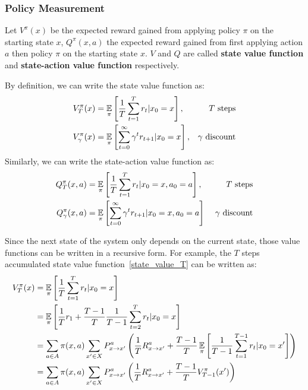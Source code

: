 \subsubsection{Policy Measurement}
Let $V^\pi(x)$ be the expected reward gained from applying policy $\pi$ on the starting state $x$, 
$Q^\pi(x, a)$ the expected reward gained from first applying action $a$ then policy $\pi$ on the starting
state $x$. $V$ and $Q$ are called \textbf{state value function} and \textbf{state-action value function}
respectively. \par
By definition, we can write the state value function as:
\begin{align}
    V^\pi_T(x) &= \operatorname*{\mathbb{E}}_\pi\left[\frac{1}{T}\sum_{t=1}^{T}r_t | x_0 = x\right], &\text{$T$ steps}
    \label{state_value_T}\\
    V^\pi_\gamma(x) &= \operatorname*{\mathbb{E}}_\pi\left[\sum_{t=0}^{\infty} \gamma^t r_{t+1} | x_0 = x\right], &\text{$\gamma$ 
    discount}\label{state_value_gamma}
\end{align}
Similarly, we can write the state-action value function as:
\begin{align}
    Q^\pi_T(x, a) &= \operatorname*{\mathbb{E}}_\pi\left[\frac{1}{T}\sum_{t=1}^T r_t | x_0 = x, a_0 = a\right], &\text{$T$ steps}
    \label{state-action_value_T}\\
    Q^\pi_\gamma(x, a) &= \operatorname*{\mathbb{E}}_\pi\left[\sum_{t=0}^\infty \gamma^t r_{t+1} | x_0 = x, a_0 = a\right] &\text{
    $\gamma$ discount}\label{state-action_value_gamma}
\end{align}
\par
Since the next state of the system only depends on the current state, those value functions can be written in
a recursive form. For example, the $T$ steps accumulated state value function~\eqref{state_value_T} can be 
written as:
\begin{align}
    V^\pi_T(x) &= \operatorname*{\mathbb{E}}_\pi \left[\frac{1}{T}\sum_{t=1}^T r_t | x_0 = x\right]\nonumber\\
               &= \operatorname*{\mathbb{E}}_\pi \left[\frac{1}{T} r_1 + \frac{T-1}{T}\frac{1}{T-1}\sum_{t=2}^T r_t | x_0 = x\right]
               \nonumber\\
               &= \sum_{a\in A}\pi(x, a)\sum_{x'\in X}P_{x\rightarrow x'}^a\left(\frac{1}{T}
               R_{x\rightarrow x'}^a + \frac{T-1}{T}\operatorname*{\mathbb{E}}_\pi\left[\frac{1}{T-1}\sum_{t=1}^{T-1}r_t | x_0=x'
               \right]\right)\nonumber\\
               &= \sum_{a\in A}\pi(x, a)\sum_{x'\in X}P_{x\rightarrow x'}^a\left(\frac{1}{T}
               R_{x\rightarrow x'}^a + \frac{T-1}{T} V^\pi_{T-1}(x')\right)\label{state_value_T_expansion}
\end{align}

